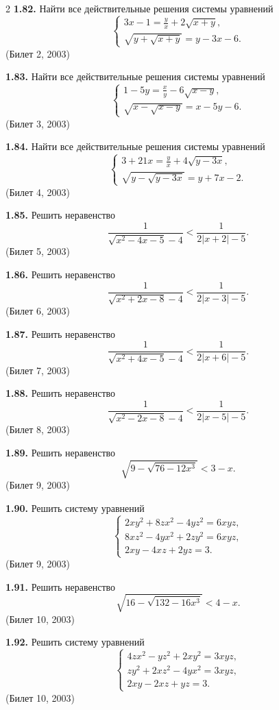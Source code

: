 \documentclass[14pt,a4paper,landscape]{extarticle}
\begin{document}
\begin{multicols}{2}
\textbf{1.82.} Найти все действительные решения системы уравнений
\[
\begin{cases}
3x - 1 = \frac{y}{x} + 2\sqrt{x + y}, \\[1ex]
\sqrt{y + \sqrt{x + y}} = y - 3x - 6.
\end{cases}
\]
\hfill \textnormal{(Билет 2, 2003)}

\textbf{1.83.} Найти все действительные решения системы уравнений
\[
\begin{cases}
1 - 5y = \frac{x}{y} - 6\sqrt{x - y}, \\[1ex]
\sqrt{x - \sqrt{x - y}} = x - 5y - 6.
\end{cases}
\]
\hfill \textnormal{(Билет 3, 2003)}

\textbf{1.84.} Найти все действительные решения системы уравнений
\[
\begin{cases}
3 + 21x = \frac{y}{x} + 4\sqrt{y - 3x}, \\[1ex]
\sqrt{y - \sqrt{y - 3x}} = y + 7x - 2.
\end{cases}
\]
\hfill \textnormal{(Билет 4, 2003)}

\textbf{1.85.} Решить неравенство
\[
\frac{1}{\sqrt{x^2 - 4x - 5} - 4} < \frac{1}{2|x + 2| - 5}.
\]
\hfill \textnormal{(Билет 5, 2003)}

\textbf{1.86.} Решить неравенство
\[
\frac{1}{\sqrt{x^2 + 2x - 8} - 4} < \frac{1}{2|x - 3| - 5}.
\]
\hfill \textnormal{(Билет 6, 2003)}

\textbf{1.87.} Решить неравенство
\[
\frac{1}{\sqrt{x^2 + 4x - 5} - 4} < \frac{1}{2|x + 6| - 5}.
\]
\hfill \textnormal{(Билет 7, 2003)}

\textbf{1.88.} Решить неравенство
\[
\frac{1}{\sqrt{x^2 - 2x - 8} - 4} < \frac{1}{2|x - 5| - 5}.
\]
\hfill \textnormal{(Билет 8, 2003)}

\textbf{1.89.} Решить неравенство
\[
\sqrt{9 - \sqrt{76 - 12x^3}} < 3 - x.
\]
\hfill \textnormal{(Билет 9, 2003)}

\textbf{1.90.} Решить систему уравнений
\[
\begin{cases}
2xy^2 + 8zx^2 - 4yz^2 = 6xyz, \\
8xz^2 - 4yx^2 + 2zy^2 = 6xyz, \\
2xy - 4xz + 2yz = 3.
\end{cases}
\]
\hfill \textnormal{(Билет 9, 2003)}

\textbf{1.91.} Решить неравенство
\[
\sqrt{16 - \sqrt{132 - 16x^3}} < 4 - x.
\]
\hfill \textnormal{(Билет 10, 2003)}

\textbf{1.92.} Решить систему уравнений
\[
\begin{cases}
4zx^2 - yz^2 + 2xy^2 = 3xyz, \\
zy^2 + 2xz^2 - 4yx^2 = 3xyz, \\
2xy - 2xz + yz = 3.
\end{cases}
\]
\hfill \textnormal{(Билет 10, 2003)}


\end{multicols}
\end{document}
